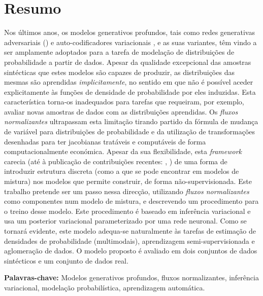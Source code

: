 \section*{Resumo}


Nos últimos anos, os modelos generativos profundos, tais como redes generativas
adversariais (\autocite{GAN}) e auto-codificadores variacionais \autocite{vaepaper},
e as suas variantes, têm vindo a ser amplamente adoptados para a tarefa de modelação
de distribuições de probabilidade a partir de dados. Apesar da qualidade excepcional das amostras sintécticas
que estes modelos são capazes de produzir, as distribuições das mesmas são aprendidas
\emph{implicitamente}, no sentido em que não é possível aceder explicitamente às funções de densidade
de probabilidade por eles induzidas. Esta característica torna-os inadequados para tarefas que
requeiram, por exemplo, avaliar novas amostras de dados com as distribuições
aprendidas. Os \emph{fluxos normalizantes} ultrapassam esta limitação tirando partido da
fórmula de mudança de variável para distribuições de probabilidade e da utilização
de transformações desenhadas para ter jacobianas tratáveis e computáveis de forma
computacionalmente económica. Apesar da sua flexibilidade, esta \emph{framework} carecia (até à publicação
de contribuições recentes: \autocite{semisuplearning_nflows}, \autocite{RAD}) de uma forma
de introduzir estrutura discreta (como a que se pode encontrar em modelos de mistura)
nos modelos que permite construir, de forma não-supervisionada. Este trabalho
pretende ser um passo nessa direcção, utilizando \emph{fluxos normalizantes} como
componentes num modelo de mistura, e descrevendo um procedimento para o treino
desse modelo. Este procedimento é baseado em inferência variacional e usa um posterior
variacional parameterizado por uma rede neuronal. Como se tornará evidente, este
modelo adequa-se naturalmente às tarefas de estimação de densidades de probabilidade (multimodais),
aprendizagem semi-supervisionada e aglomeração de dados. O modelo proposto é
avaliado em dois conjuntos de dados sintécticos e um conjunto de dados real.
\vfill

\textbf{\Large Palavras-chave:} Modelos generativos profundos, fluxos normalizantes,
inferência variacional, modelação probabilística, aprendizagem automática.
